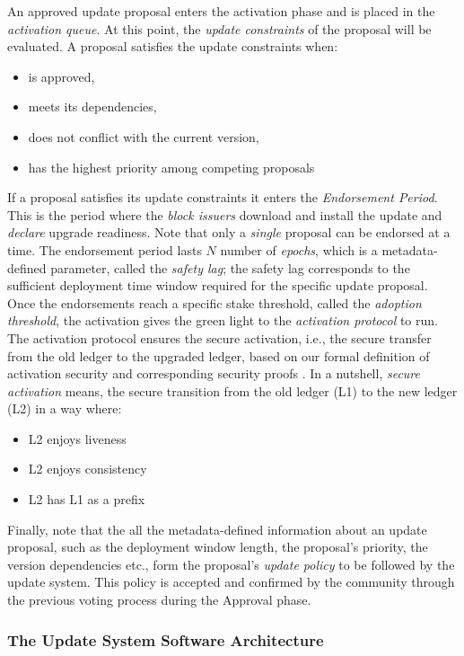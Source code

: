 {An approved update proposal enters the activation phase and is placed in the
\emph{activation queue}. At this point, the
\emph{update constraints} of the proposal will be evaluated. A proposal
satisfies the update constraints when:
\begin{itemize}
	\item is approved,
	\item meets its dependencies,
	\item does not conflict with the current version,
	\item has the highest priority among competing proposals
\end{itemize}

If a proposal satisfies its update constraints it enters the \emph{Endorsement
	Period}. This is the period where the \emph{block issuers} download and
install the update and \emph{declare} upgrade readiness. Note that only a
\emph{single} proposal can be endorsed at a time. The endorsement period lasts
$N$ number of \emph{epochs}, which is a metadata-defined parameter, called the
\emph{safety lag}; the safety lag corresponds to the sufficient deployment time
window required for the specific update proposal. Once the endorsements reach a
specific stake threshold, called the \emph{adoption threshold}, the activation
gives the green light to the \emph{activation protocol} to run. The activation
protocol ensures the secure activation, i.e., the secure transfer from the old
ledger to the upgraded ledger, based on our formal definition of activation
security and corresponding security proofs \cite{secure_activation}. In a
nutshell, \emph{secure activation} means, the secure transition from the old
ledger (L1) to the new ledger (L2) in a way where:
\begin{itemize}
	\item L2 enjoys liveness
	\item L2 enjoys consistency
	\item L2 has L1 as a prefix
\end{itemize}

Finally, note that the
all the metadata-defined information about an update proposal, such as the
deployment window length, the proposal's priority, the version dependencies
etc., form the proposal's \emph{update policy} to be followed by the update
system. This policy is accepted and confirmed by the community through the
previous voting
process during the Approval phase.
} %

\subsubsection{The Update System Software Architecture}

